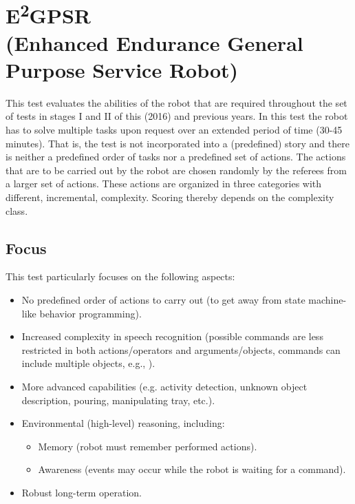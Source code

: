 %
%

\newcommand{\eegpsrTeams}{2~}
\newcommand{\eegpsrMaxCmd}{3~}
\newcommand{\eegpsrMaxCmdTime}{5~}
\newcommand{\eegpsrMaxTeamTime}{15~}

\section[EEGPSR]{E\textsuperscript{2}GPSR \\ \normalsize{(Enhanced Endurance General Purpose Service Robot)}}
\label{sec:eegpsr}

This test evaluates the abilities of the robot that are required throughout the set of tests in stages I and II of this (2016) and previous years. In this test the robot has to solve multiple tasks upon request over an extended period of time (30-45 minutes). That is, the test is not incorporated into a (predefined) story and there is neither a predefined order of tasks nor a predefined set of actions. The actions that are to be carried out by the robot are chosen randomly by the referees from a larger set of actions. These actions are organized in three categories with different, incremental, complexity. Scoring thereby depends on the complexity class.

\subsection{Focus}
This test particularly focuses on the following aspects:
\begin{itemize}
	\item No predefined order of actions to carry out (to get away from state machine-like behavior programming).

	\item Increased complexity in speech recognition (possible commands are less restricted in both actions/operators and arguments/objects, commands can include multiple objects, e.g., ).

	\item More advanced capabilities (e.g. activity detection, unknown object description, pouring, manipulating tray, etc.).

	\item Environmental (high-level) reasoning, including:
  \begin{itemize}
	\item Memory (robot must remember performed actions).
	\item Awareness (events may occur while the robot is waiting for a command).
  \end{itemize}

  \item Robust long-term operation.

\end{itemize}

